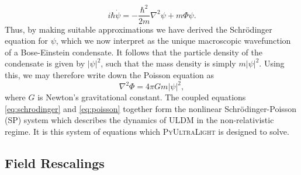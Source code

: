 \documentclass[a4paper,11pt]{article}
\newcommand{\PyUltraLight}{\textsc{PyUltraLight }}
\begin{document}
\begin{equation}\label{eq:schrodinger}
    i\hbar\Dot{\psi}=-\frac{\hbar^2}{2m}\nabla^2\psi+m\Phi\psi.
\end{equation}
Thus, by making suitable approximations we have derived the Schr{\"o}dinger equation for $\psi$, which we now interpret as the unique macroscopic wavefunction of a Bose-Einstein condensate. It follows that the particle density of the condensate is given by $\vert\psi\vert^2$, such that the mass density is simply $m\vert\psi\vert^2$. Using this, we may therefore write down the Poisson equation as
\begin{equation}\label{eq:poisson}
    \nabla^2\Phi=4\pi G m \vert\psi\vert^2,
\end{equation}
where $G$ is Newton's gravitational constant. The coupled equations \ref{eq:schrodinger} and \ref{eq:poisson} together form the nonlinear Schr{\"o}dinger-Poisson (SP) system which describes the dynamics of ULDM in the non-relativistic regime. It is this system of equations which \PyUltraLight is designed to solve.


\subsection{Field Rescalings}
\end{document}

